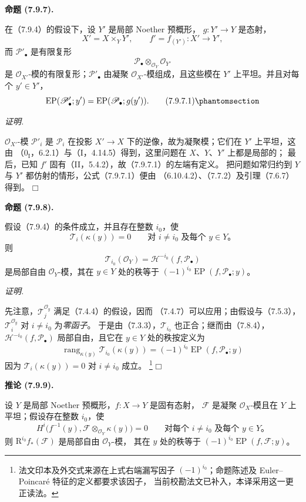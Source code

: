 \documentclass[UTF8,fontset=none,11pt,oneside,openany]{ctexbook}
\providecommand{\square}{\mdlgwhtsquare}
\newcommand{\SourceCorrectionNote}[1]{\footnote{#1}}
\newenvironment{proposition}[1][]{%
  \par\medskip\noindent\textbf{命题 (#1).}\ %
}{\par}
\newenvironment{corollary}[1][]{%
  \par\medskip\noindent\textbf{推论 (#1).}\ %
}{\par}
\newenvironment{proof}{%
  \par\smallskip\noindent\textit{证明.}\ %
}{\hfill$\square$\par}
\let\EGAOriginalLabel\label
\renewcommand{\label}[1]{\phantomsection\EGAOriginalLabel{#1}}
\begin{document}
\begin{proposition}[7.9.7]
\label{III.7.9.7.fr}
在（7.9.4）的假设下，设 $Y'$ 是局部 Noether 预概形，
$g:Y'\to Y$ 是态射，
\[
  X'=X\times_Y Y',
  \qquad f'=f_{(Y')}:X'\longrightarrow Y',
\]
而 $\mathscr P'_\bullet$ 是有限复形
\[
  \mathscr P_\bullet\otimes_{\mathscr O_Y}\mathscr O_{Y'}
\]
是 $\mathscr O_{X'}$-模的有限复形；$\mathscr P'_\bullet$ 由凝聚
$\mathscr O_{X'}$-模组成，且这些模在 $Y'$ 上平坦。并且对每个
$y'\in Y'$，
\[
  \operatorname{EP}(\mathscr P'_\bullet;y')
  =\operatorname{EP}(\mathscr P_\bullet;g(y')).
  \tag{7.9.7.1}\label{III.7.9.7.1.fr}
\]
\end{proposition}

\begin{proof}
$\mathscr O_{X'}$-模 $\mathscr P'_i$ 是 $\mathscr P_i$ 在投影
$X'\to X$ 下的逆像，故为凝聚模；它们在 $Y'$ 上平坦，这由
（$0_{\mathrm I}$，6.2.1）与（I，4.14.5）得到，这里问题在
$X$、$Y$、$Y'$ 上都是局部的；
最后，已知 $f'$ 固有（II，5.4.2），故（7.9.7.1）的左端有定义。
把问题如常归约到 $Y$ 与 $Y'$ 都仿射的情形，公式（7.9.7.1）便由
（6.10.4.2）、（7.7.2）及引理（7.6.7）得到。
\end{proof}

\begin{proposition}[7.9.8]
\label{III.7.9.8.fr}
假设（7.9.4）的条件成立，并且存在整数 $i_0$，使
\[
  \mathscr T_i(\kappa(y))=0
  \qquad\text{对 $i\ne i_0$ 及每个 $y\in Y$。}
\]
则
\[
  \mathscr T_{i_0}(\mathscr O_Y)
  =\mathscr H^{-i_0}(f,\mathscr P_\bullet)
\]
是局部自由 $\mathscr O_Y$-模，其在 $y\in Y$ 处的秩等于
$(-1)^{i_0}\operatorname{EP}(f,\mathscr P_\bullet;y)$。
\end{proposition}

\begin{proof}
先注意，$\mathscr T_j^{\mathscr O_y}$ 满足（7.4.4）的假设，因而
（7.4.7）可以应用；由假设与（7.5.3），
$\mathscr T_i^{\mathscr O_y}$ 对 $i\ne i_0$ 为\emph{零函子}。
于是由（7.3.3），$\mathscr T_{i_0}$ 也正合；继而由（7.8.4），
$\mathscr H^{-i_0}(f,\mathscr P_\bullet)$ 局部自由，且它在
$y\in Y$ 处的秩按定义为
\[
  \operatorname{rang}_{\kappa(y)}
  \mathscr T_{i_0}(\kappa(y))
  =(-1)^{i_0}\operatorname{EP}(f,\mathscr P_\bullet;y)
\]
因为 $\mathscr T_i(\kappa(y))=0$ 对 $i\ne i_0$ 成立。
\SourceCorrectionNote{法文印本及外交式来源在上式右端漏写因子
$(-1)^{i_0}$；命题陈述及 Euler--Poincaré 特征的定义都要求该因子，
当前校勘法文已补入，本译采用这一更正读法。}
\end{proof}

\begin{corollary}[7.9.9]
\label{III.7.9.9.fr}
设 $Y$ 是局部 Noether 预概形，$f:X\to Y$ 是固有态射，
$\mathscr F$ 是凝聚 $\mathscr O_X$-模且在 $Y$ 上平坦；假设存在整数
$i_0$，使
\[
  H^i\bigl(f^{-1}(y),
  \mathscr F\otimes_{\mathscr O_Y}\kappa(y)\bigr)=0
  \qquad\text{对每个 $i\ne i_0$ 及每个 $y\in Y$。}
\]
则 $\mathrm R^{i_0}f_*(\mathscr F)$ 是局部自由 $\mathscr O_Y$-模，
其在 $y$ 处的秩等于 $(-1)^{i_0}\operatorname{EP}(f,\mathscr F;y)$。
\end{corollary}
\end{document}
